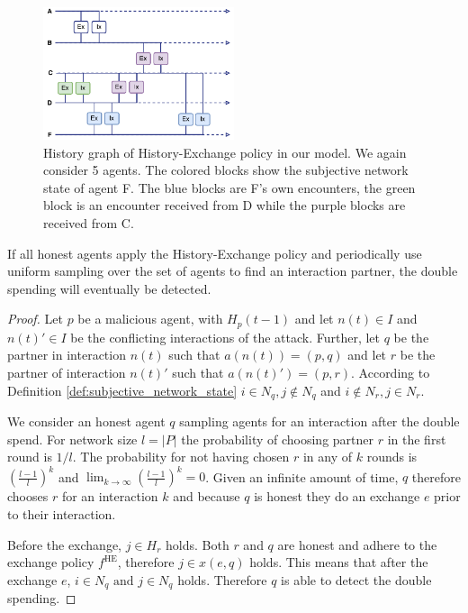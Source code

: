 \begin{figure}
    \centering
    \includegraphics[width=0.5\textwidth]{images/chain_exchange.pdf}
    \caption{History graph of History-Exchange policy in our model. We again consider 5 agents. The 
    colored blocks show the subjective network state of agent F. The blue blocks are F's own encounters,
    the green block is an encounter received from D while the purple blocks are received from C.}
    \label{fig:chain_exchange}
\end{figure}

\begin{thm}
    \label{thm:fork_gossiping}
    If all honest agents apply the History-Exchange policy and periodically use uniform sampling over
    the set of agents to find an interaction partner, the double spending will eventually be detected.
\end{thm}
\begin{proof}
    Let $p$ be a malicious agent, with $H_p(t-1)$ and let $n(t) \in I$ and $n(t)' \in I$ be the conflicting 
    interactions of the attack. 
    Further, let $q$ be the partner in interaction $n(t)$ such that 
    $a(n(t)) = (p, q)$ and let $r$ be the partner of interaction $n(t)'$ such that $a(n(t)') = (p, r)$. 
    According to Definition \ref{def:subjective_network_state} $i \in N_{q}, j \notin N_{q}$ and 
    $i \notin N_{r}, j \in N_{r}$.

    We consider an honest agent $q$ sampling agents for an interaction after the double spend. 
    For network size $l = |P|$ the 
    probability of choosing partner $r$ in the first round is $1/l$. The probability for not having
    chosen $r$ in any of $k$ rounds is $(\frac{l-1}{l})^k$ and $\lim_{k\to\infty}(\frac{l-1}{l})^k = 0$.
    Given an infinite amount of time, $q$ therefore chooses $r$ for an interaction $k$ and because $q$ is 
    honest they do an exchange $e$ prior to their interaction. 
    
    Before the exchange, $j \in H_r$ holds. Both $r$ and $q$ are honest and adhere to the exchange 
    policy $f^{\text{HE}}$, therefore $j \in x(e, q)$ holds. This means that after the exchange $e$, 
    $i \in N_q \text{ and } j \in N_q$ holds. Therefore $q$ is able to detect the double spending.
\end{proof}

